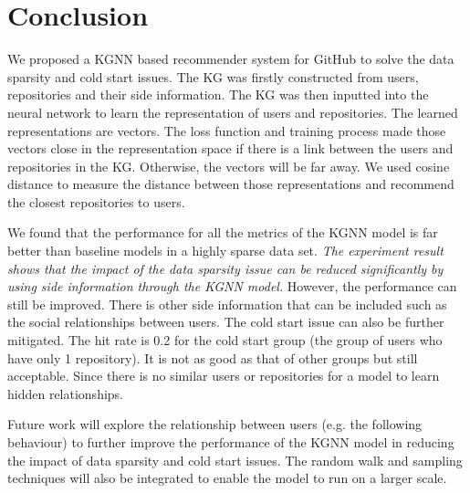 \documentclass[11pt,twoside]{report}
\begin{document}
\chapter{Conclusion}
We proposed a KGNN based recommender system for GitHub to solve the data sparsity and cold start issues. The KG was firstly constructed from users, repositories and their side information. The KG was then inputted into the neural network to learn the representation of users and repositories. The learned representations are vectors. The loss function and training process made those vectors close in the representation space if there is a link between the users and repositories in the KG. Otherwise, the vectors will be far away. We used cosine distance to measure the distance between those representations and recommend the closest repositories to users.

We found that the performance for all the metrics of the KGNN model is far better than baseline models in a highly sparse data set. \textit{The experiment result shows that the impact of the data sparsity issue can be reduced significantly by using side information through the KGNN model.} However, the performance can still be improved. There is other side information that can be included such as the social relationships between users. The cold start issue can also be further mitigated. The hit rate is 0.2 for the cold start group (the group of users who have only 1 repository). It is not as good as that of other groups but still acceptable. Since there is no similar users or repositories for a model to learn hidden relationships.

Future work will explore the relationship between users (e.g. the following behaviour) to further improve the performance of the KGNN model in reducing the impact of data sparsity and cold start issues. The random walk and sampling techniques will also be integrated to enable the model to run on a larger scale.




\end{document}
